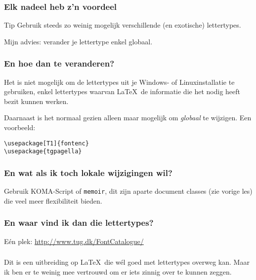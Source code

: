 \begin{frame}
  \frametitle{Elk nadeel heb z'n voordeel}

  \begin{exampleblock}{Tip}
	  Gebruik steeds zo weinig mogelijk verschillende (en exotische) lettertypes.
  \end{exampleblock}

  Mijn advies: verander je lettertype enkel globaal.
\end{frame}

\begin{frame}[fragile]
  \frametitle{En hoe dan te veranderen?}

  Het is niet mogelijk om de lettertypes uit je Windows- of Linuxinstallatie te gebruiken, enkel lettertypes waarvan \LaTeX~de informatie die het nodig heeft bezit kunnen werken.

  Daarnaast is het normaal gezien alleen maar mogelijk om \emph{globaal} te wijzigen. Een voorbeeld:
\begin{verbatim}
\usepackage[T1]{fontenc}
\usepackage{tgpagella}
\end{verbatim}
\end{frame}

\begin{frame}[fragile]
  \frametitle{En wat als ik toch lokale wijzigingen wil?}

  Gebruik KOMA-Script of \texttt{memoir}, dit zijn aparte document classes (zie vorige les) die veel meer flexibiliteit bieden.
\end{frame}

\begin{frame}
  \frametitle{En waar vind ik dan die lettertypes?}

  E\'en plek: \url{http://www.tug.dk/FontCatalogue/}
\end{frame}

\begin{frame}[fragile]
  \frametitle{\XeTeX}

  Dit is een uitbreiding op \LaTeX~die w\'el goed met lettertypes overweg kan. Maar ik ben er te weinig mee vertrouwd om er iets zinnig over te kunnen zeggen.
\end{frame}

